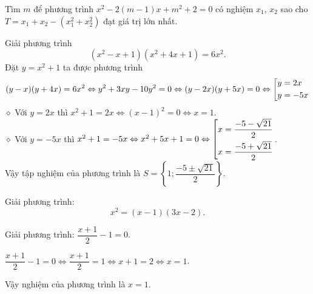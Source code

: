    \begin{bt}%
   	Tìm $m$ để phương trình $x^2-2(m-1)x+m^2+2=0$ có nghiệm $x_1$, $x_2$ sao cho $T=x_1+x_2-(x_1^2+x_2^2)$ đạt giá trị lớn nhất.
   \end{bt}
   \begin{bt}%
   	Giải phương trình 
   	$$\left( x^2-x+1\right)\left( x^2+4x+1\right)=6x^2.$$
   	\loigiai
   	{
   		Đặt $y=x^2+1$ ta được phương trình 
   		$$(y-x)(y+4x)=6x^2 \Leftrightarrow y^2+3xy-10y^2=0 \Leftrightarrow (y-2x)(y+5x)=0\Leftrightarrow \left[\begin{aligned}&y=2x\\&y=-5x\end{aligned}\right.$$
   		$\diamond$ Với $y=2x$ thì $x^2+1=2x \Leftrightarrow (x-1)^2=0 \Leftrightarrow x=1$.\\
   		$\diamond$ Với $y=-5x$ thì $x^2+1=-5x \Leftrightarrow x^2+5x+1=0 \Leftrightarrow \left[\begin{aligned}&x=\dfrac{-5-\sqrt{21}}{2}\\&x=\dfrac{-5+\sqrt{21}}{2}\end{aligned}\right.$.\\
   		Vậy tập nghiệm của phương trình là $S=\left\lbrace 1;\dfrac{-5\pm \sqrt{21}}{2}\right\rbrace.$
   	}
   \end{bt}
   \begin{bt}%
   	Giải phương trình: 
   	$$x^2=(x-1)(3x-2).$$
   	
   \end{bt}
   \begin{bt}%
   	Giải phương trình: $\dfrac{x+1}{2}-1=0$.
   	\loigiai
   	{
   		$\dfrac{x+1}{2}-1=0\Leftrightarrow \dfrac{x+1}{2}=1\Leftrightarrow x+1=2 \Leftrightarrow x=1$.
   		
   		Vậy nghiệm của phương trình là $x=1$.
   	}
   \end{bt}
   
